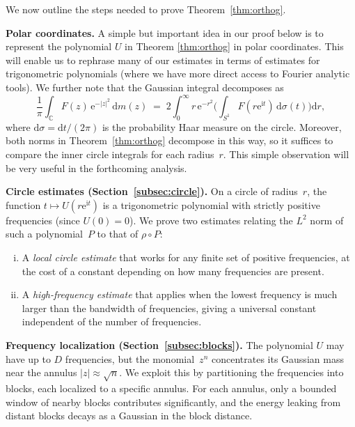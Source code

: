 \documentclass[11pt]{amsart}
\theoremstyle{remark}
\begin{document}
We now outline the steps needed to prove Theorem~\ref{thm:orthog}.
 \vspace{0.5em}

\noindent
\textbf{Polar coordinates.}\;
A simple but important idea in our proof below is to represent the polynomial $U$ in Theorem \ref{thm:orthog} in polar coordinates. This will enable us to rephrase many of our estimates in terms of estimates for trigonometric polynomials (where we have more direct access to Fourier analytic tools). We further note that the Gaussian integral decomposes as
\begin{equation}\label{eq:polar}
\frac{1}{\pi}\int_{\mathbb{C}} F(z)\, \mathrm{e}^{-\lvert z \rvert^2}\,\mathrm{d} m(z)
\;=\;
2\int_0^\infty r\,\mathrm{e}^{-r^2}
\biggl(\int_{S^1} F(r\mathrm{e}^{\mathrm{i} t})\,\mathrm{d}\sigma(t)\biggr)\mathrm{d} r,
\end{equation}
where $\mathrm{d}\sigma = \mathrm{d} t/(2\pi)$ is the probability Haar measure on the
circle. Moreover, both norms in Theorem~\ref{thm:orthog} decompose in this way, so it
suffices to compare the inner circle integrals for each radius~$r$. This simple observation will be very useful in the forthcoming analysis.
 \vspace{0.5em}

\noindent
\textbf{Circle estimates (Section~\ref{subsec:circle}).}\;
On a circle of radius~$r$, the function $t \mapsto U(r\mathrm{e}^{\mathrm{i} t})$ is a
trigonometric polynomial with strictly positive frequencies (since
$U(0) = 0$).  We prove two estimates relating the $L^2$ norm of such a
polynomial~$P$ to that of $\rho \circ P$:
\begin{enumerate}[(i)]
\item A \emph{local circle estimate} that works for any finite set of
  positive frequencies, at the cost of a constant depending on how many
  frequencies are present.

\item A \emph{high-frequency estimate} that applies when the lowest
  frequency is much larger than the bandwidth of frequencies, giving a universal constant
  independent of the number of frequencies.
\end{enumerate}
 \vspace{0.5em}

\noindent
\textbf{Frequency localization (Section~\ref{subsec:blocks}).}\; The polynomial $U$ may have up to $D$ frequencies, but the monomial~$z^n$
concentrates its Gaussian mass near the annulus $\lvert z \rvert \approx \sqrt{n}$.
We exploit this by partitioning the frequencies into blocks, each localized
to a specific annulus.  For each annulus, only a bounded window of nearby
blocks contributes significantly, and the energy leaking from distant blocks
decays as a Gaussian in the block distance.
 \vspace{0.5em}
\end{document}

